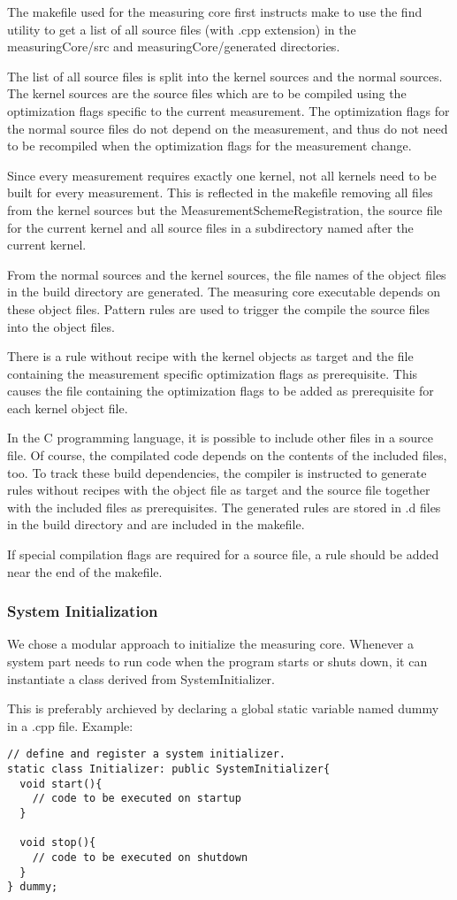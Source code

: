 \documentclass[a4paper,12pt]{article}
\newcommand{\file}[1]{}
\begin{document}
The makefile used for the measuring core first instructs make to use the find utility to get a list of all source files (with .cpp extension) in the measuringCore/src and measuringCore/generated directories.

The list of all source files is split into the kernel sources and the normal sources. The kernel sources are the source files which are to be compiled using the optimization flags specific to the current measurement. The optimization flags for the normal source files do not depend on the measurement, and thus do not need to be recompiled when the optimization flags for the measurement change.

Since every measurement requires exactly one kernel, not all kernels need to be built for every measurement. This is reflected in the makefile removing all files from the kernel sources but the MeasurementSchemeRegistration, the source file for the current kernel and all source files in a subdirectory named after the current kernel.

From the normal sources and the kernel sources, the file names of the object files in the build directory are generated. The measuring core executable depends on these object files. Pattern rules are used to trigger the compile the source files into the object files.

There is a rule without recipe with the kernel objects as target and the file containing the measurement specific optimization flags as prerequisite. This causes the file containing the optimization flags to be added as prerequisite for each kernel object file.

In the C programming language, it is possible to include other files in a source file. Of course, the compilated code depends on the contents of the included files, too. To track these build dependencies, the compiler is instructed to generate rules without recipes with the object file as target and the source file together with the included files as prerequisites. The generated rules are stored in .d files in the build directory and are included in the makefile.

If special compilation flags are required for a source file, a rule should be added near the end of the makefile.

\subsubsection{System Initialization}
We chose a modular approach to initialize the measuring core. Whenever a system part needs to run code when the program starts or shuts down, it can instantiate a class derived from SystemInitializer.
\file{measuringCore/baseClasses/SystemInitializer.h}
This is preferably archieved by declaring a global static variable named dummy in a .cpp file. Example:
\begin{verbatim}
// define and register a system initializer.
static class Initializer: public SystemInitializer{
  void start(){
    // code to be executed on startup
  }

  void stop(){
    // code to be executed on shutdown
  }
} dummy;
\end{verbatim}
\end{document}
